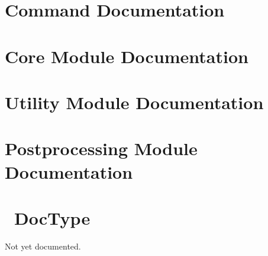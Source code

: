 \documentclass{report}
\begin{document}
\printindex\label{idx}
\appendix
\chapter[Commands]{Command Documentation}\label{commands}



\chapter[Modules]{Core Module Documentation}\label{coremodules}
























\chapter[Utility Modules]{Utility Module Documentation}\label{utilitymodules}


\chapter[Postprocessing Modules]{Postprocessing Module Documentation}\label{postmodules}


\chapter[DocType]{\LaTeXML\ DocType}\label{dtd}
Not yet documented.
\end{document}
